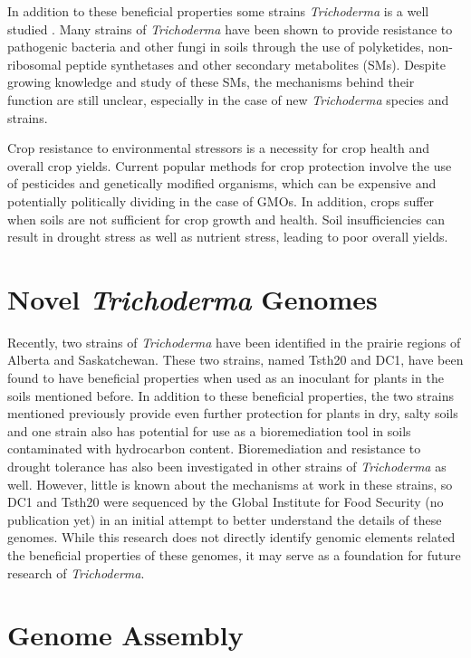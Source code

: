 In addition to these beneficial properties some strains  \textit{Trichoderma} is a
well studied . Many strains of \textit{Trichoderma} have been shown to
provide resistance to pathogenic bacteria and other fungi in soils
through the use of polyketides, non-ribosomal peptide synthetases and
other secondary metabolites\cite{Woo2023} (SMs). Despite growing
knowledge and study of these SMs, the mechanisms behind their function
are still unclear\cite{Baker2012}, especially in the case of new
\textit{Trichoderma} species and strains.

Crop resistance to environmental stressors is a necessity for crop
health and overall crop yields. Current popular methods for crop
protection involve the use of pesticides and genetically modified
organisms, which can be expensive and potentially politically dividing
in the case of GMOs\cite{doi:10.1080/10408390600762696}. In addition,
crops suffer when soils are not sufficient for crop growth and
health. Soil insufficiencies can result in drought stress as well as
nutrient stress, leading to poor overall yields.

\section{Novel \textit{Trichoderma} Genomes}

Recently, two strains of \textit{Trichoderma}
have been identified in the prairie regions of Alberta and
Saskatchewan. These two strains, named Tsth20 and DC1, have been found
to have beneficial properties when used as an inoculant for plants in
the soils mentioned before. In addition to these beneficial
properties, the two strains mentioned previously provide even further
protection for plants in dry, salty soils and one strain also has
potential for use as a bioremediation tool in soils contaminated with
hydrocarbon content. Bioremediation and resistance to drought
tolerance has also been investigated in other strains of
\textit{Trichoderma} as well\cite{10.3389/fpls.2023.1190304}. However,
little is known about the mechanisms at work in these strains, so DC1
and Tsth20 were sequenced by the Global Institute for Food Security
(no publication yet) in an initial attempt to better understand the
details of these genomes. While this research does not directly
identify genomic elements related the beneficial properties of these
genomes, it may serve as a foundation for future research of
\textit{Trichoderma}.

\section{Genome Assembly}

